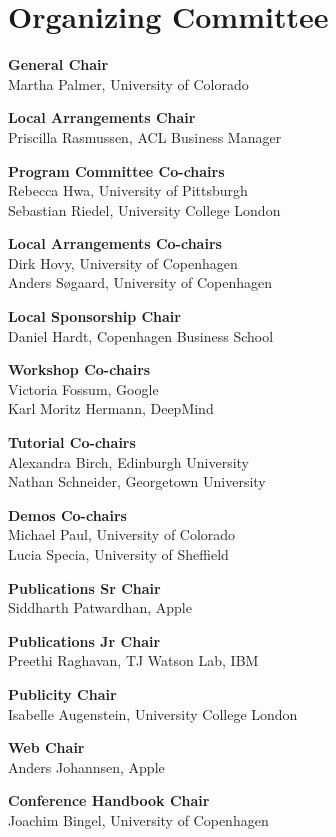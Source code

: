 \markboth{}{} %
\markright{}{} %

\section{Organizing Committee}{}

\setlength{\parindent}{0pt}

{\bf General Chair} \\
Martha Palmer, University of Colorado

{\bf Local Arrangements Chair} \\
Priscilla Rasmussen, ACL Business Manager

{\bf Program Committee Co-chairs} \\
Rebecca Hwa, University of Pittsburgh \\
Sebastian Riedel, University College London

{\bf Local Arrangements Co-chairs} \\
Dirk Hovy, University of Copenhagen \\
Anders S{\o}gaard, University of Copenhagen

{\bf Local Sponsorship Chair} \\
Daniel Hardt, Copenhagen Business School

{\bf Workshop Co-chairs} \\
Victoria Fossum, Google\\
Karl Moritz Hermann, DeepMind

{\bf Tutorial Co-chairs} \\
Alexandra Birch, Edinburgh University \\
Nathan Schneider, Georgetown University

{\bf Demos Co-chairs} \\
Michael Paul, University of Colorado \\
Lucia Specia, University of Sheffield

{\bf Publications Sr Chair} \\
Siddharth Patwardhan, Apple

{\bf Publications Jr Chair} \\
Preethi Raghavan, TJ Watson Lab, IBM

{\bf Publicity Chair}\\
Isabelle Augenstein, University College London

{\bf Web Chair}\\
Anders Johannsen, Apple

{\bf Conference Handbook Chair}\\
Joachim Bingel, University of Copenhagen

